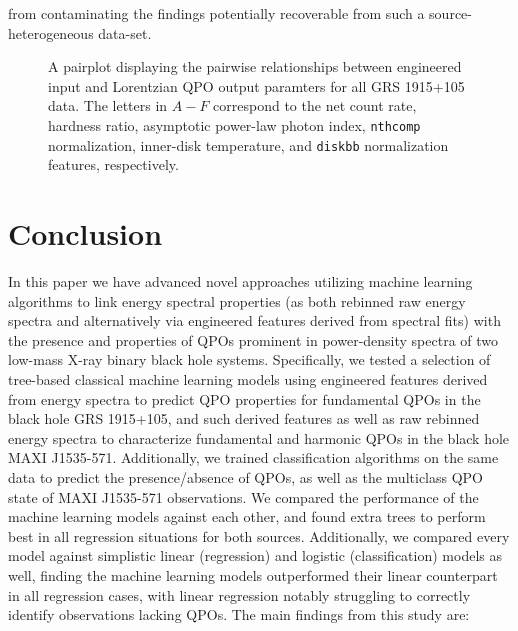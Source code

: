 \documentclass[fleqn,usenatbib,twocolumn]{mnras}%
\begin{document}
from contaminating the findings potentially recoverable from such a source-heterogeneous data-set. 


\begin{figure*}
    \centering
{}\textwidth{figures/figure_10/GRS_qpo_pairplot.pdf}
    \caption{A pairplot displaying the pairwise relationships between engineered input and Lorentzian QPO output paramters for all GRS 1915+105 data. The letters in $A-F$ correspond to the net count rate, hardness ratio, asymptotic power-law photon index, \texttt{nthcomp} normalization, inner-disk temperature, and \texttt{diskbb} normalization features, respectively.}
    \label{fig:pairplot} 
\end{figure*}

\section{Conclusion} \label{sec:conclusion}

In this paper we have advanced novel approaches utilizing machine learning algorithms to link energy spectral properties (as both rebinned raw energy spectra and alternatively via engineered features derived from spectral fits) with the presence and properties of QPOs prominent in power-density spectra of two low-mass X-ray binary black hole systems. Specifically, we tested a selection of tree-based classical machine learning models using engineered features derived from energy spectra to predict QPO properties for fundamental QPOs in the black hole GRS 1915+105, and such derived features as well as raw rebinned energy spectra to characterize fundamental and harmonic QPOs in the black hole MAXI J1535-571. Additionally, we trained classification algorithms on the same data to predict the presence/absence of QPOs, as well as the multiclass QPO state of MAXI J1535-571 observations. We compared the performance of the machine learning models against each other, and found extra trees to perform best in all regression situations for both sources. Additionally, we compared every model against simplistic linear (regression) and logistic (classification) models as well, finding the machine learning models outperformed their linear counterpart in all regression cases, with linear regression notably struggling to correctly identify observations lacking QPOs. The main findings from this study are:
\end{document}
